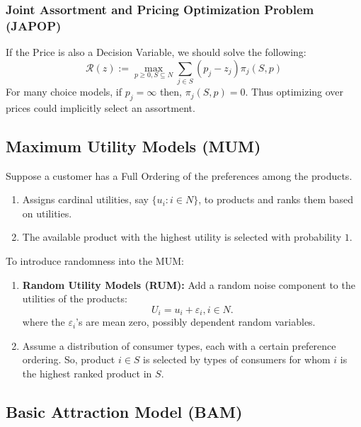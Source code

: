 \documentclass[11pt]{elegantbook}
\begin{document}
\subsubsection{Joint Assortment and Pricing Optimization Problem (JAPOP)}
If the Price is also a Decision Variable, we should solve the following:
$$
\mathcal{R}(z):=\max _{p \geq 0, S\subseteq N} \sum_{j \in S}\left(p_{j}-z_{j}\right) \pi_{j}(S, p)
$$
For many choice models, if $p_{j}=\infty$ then, $\pi_{j}(S, p)=0$. Thus optimizing over prices could implicitly select an assortment.

\subsection{Maximum Utility Models (MUM)}
Suppose a customer has a Full Ordering of the preferences among the products.
\begin{enumerate}[$\bullet$]
    \item Assigns cardinal utilities, say $\{u_i : i \in N\}$, to products and ranks them based on utilities.
    \item The available product with the highest utility is selected with probability $1$.
\end{enumerate}

To introduce randomness into the MUM:
\begin{enumerate}
    \item \textbf{Random Utility Models (RUM):} Add a random noise component to the utilities of the products: $$U_i =u_i +\varepsilon_i,i \in N.$$
    where the $\varepsilon_i$'s are mean zero, possibly dependent random variables.
    \item Assume a distribution of consumer types, each with a certain preference ordering. So, product $i\in S$ is selected by types of consumers for whom $i$ is the highest ranked product in $S$.
\end{enumerate}

\subsection{Basic Attraction Model (BAM)}
\end{document}
